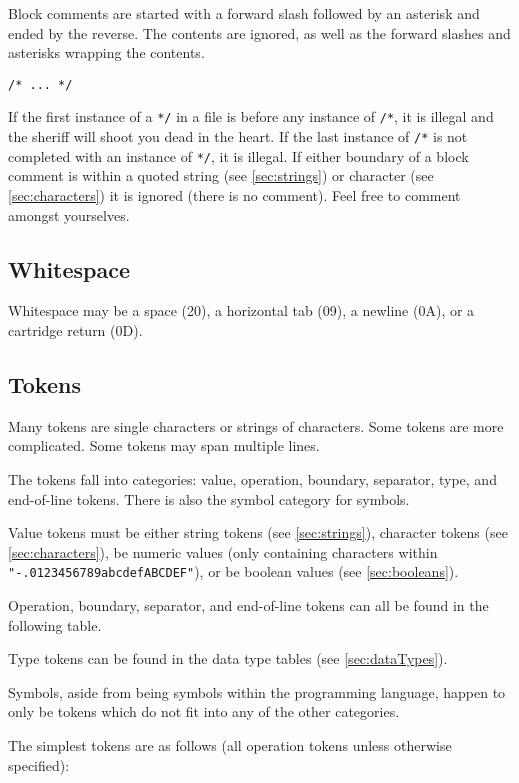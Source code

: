 \documentclass[10pt,a4paper]{article}
\begin{document}
Block comments are started with a forward slash followed by an asterisk and ended by the reverse. The contents are ignored, as well as the forward slashes and asterisks wrapping the contents.
\begin{verbatim}
/* ... */
\end{verbatim}

If the first instance of a \verb|*/| in a file is before any instance of \verb|/*|, it is illegal and the sheriff will shoot you dead in the heart. If the last instance of \verb|/*| is not completed with an instance of \verb|*/|, it is illegal. If either boundary of a block comment is within a quoted string (see \ref{sec:strings}) or character (see \ref{sec:characters}) it is ignored (there is no comment). Feel free to comment amongst yourselves. 

\subsection{Whitespace}
\label{sec:whitespace}
Whitespace may be a space (20), a horizontal tab (09), a newline (0A), or a cartridge return (0D). 

\subsection{Tokens}
\label{sec:operations}
Many tokens are single characters or strings of characters. Some tokens are more complicated. Some tokens may span multiple lines.

The tokens fall into categories: value, operation, boundary, separator, type, and end-of-line tokens. There is also the symbol category for symbols.

Value tokens must be either string tokens (see \ref{sec:strings}), character tokens (see \ref{sec:characters}), be numeric values (only containing characters within \verb|"-.0123456789abcdefABCDEF"|), or be boolean values (see \ref{sec:booleans}).

Operation, boundary, separator, and end-of-line tokens can all be found in the following table.

Type tokens can be found in the data type tables (see \ref{sec:dataTypes}).

Symbols, aside from being symbols within the programming language, happen to only be tokens which do not fit into any of the other categories. 

The simplest tokens are as follows (all operation tokens unless otherwise specified):
\end{document}

